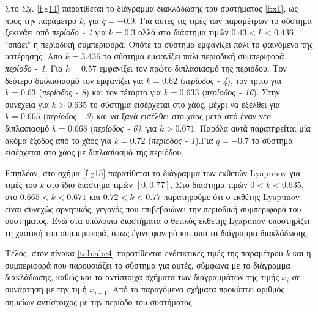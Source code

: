 Στο Σχ. \ref{f:g14} παρατίθεται το διάγραμμα διακλάδωσης του συστήματος \ref{f:x1}, ως προς την παράμετρο \emph{k}, για $q =- 0.9$. Για αυτές τις τιμές των παραμέτρων το σύστημα ξεκινάει από \emph{περίοδο - 1} για $k=0.3$ αλλά στο διάστημα τιμών $0.43<k<0.436$ "σπάει" η περιοδική συμπεριφορά. Οπότε το σύστημα εμφανίζει πάλι το φαινόμενο της υστέρησης. Απο $k=3.436$ το σύστημα εμφανίζει πάλι περιοδική συμπεριφορά \emph{περίοδο - 1}. Για  $k = 0.57$ εμφανίζει τον πρώτο διπλασιασμό της περιόδου. Τον δεύτερο διπλασιασμό τον εμφανίζει για $k=0.62$ (\emph{περίοδος - 4}), τον τρίτο για $k=0.63$ (\emph{περίοδος - 8}) και τον τέταρτο για $k=0.633$ (\emph{περίοδος - 16}). Στην συνέχεια για $k>0.635$ το σύστημα εισέρχεται στο χάος, μέχρι να εξέλθει για $k=0.665$ (\emph{περίοδος - 3}) και να ξανά εισέλθει στο χάος μετά από έναν νέο διπλασιασμό $k=0.668$ (\emph{περίοδος - 6)}, για $k>0.671$. Παρόλα αυτά παρατηρείται μία ακόμα έξοδος από το χάος για $k=0.72$ (\emph{περίοδος - 1}).Για $q=-0.7$ το σύστημα εισέρχεται στο χάος με διπλασιασμό της περιόδου.

Επιπλέον, στο σχήμα \ref{f:g15} παρατίθεται το διάγραμμα των εκθετών Lyapunov για τιμές του \emph{k} στο ίδιο διάστημα τιμών $[0, 0.77]$. Στο διάστημα τιμών   $0<k<0.635$, στο $0.665<k<0.671$ και $0.72<k<0.77$ παρατηρούμε ότι ο εκθέτης Lyapunov είναι συνεχώς αρνητικός, γεγονός που επιβεβαιώνει την περιοδική συμπεριφορά του συστήματος. Ενώ στα υπόλοιπα διαστήματα ο θετικός εκθέτης Lyapunov υποστηρίζει τη χαοτική του συμπεριφορά, όπως έγινε φανερό και από το διάγραμμα διακλάδωσης.

Τέλος, στον πίνακα \ref{tab:abc4} παρατίθενται ενδεικτικές τιμές της παραμέτρου \emph{k} και η συμπεριφορά που παρουσιάζει το σύστημα για αυτές, σύμφωνα με το διάγραμμα διακλάδωσης, καθώς και τα αντίστοιχα σχήματα των διαγραμμάτων της τιμής \(x_i\) σε συνάρτηση με την τιμή \(x_{i+1}\). Από τα παραγόμενα σχήματα προκύπτει αριθμός σημείων αντίστοιχος με την περίοδο του συστήματος.\\\\

